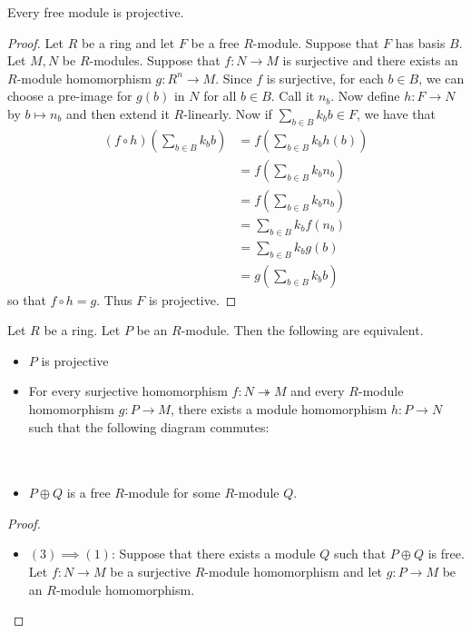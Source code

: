 \documentclass[a4paper]{article}
\begin{document}
\begin{lmm}{}{} Every free module is projective. 
\begin{proof}
Let $R$ be a ring and let $F$ be a free $R$-module. Suppose that $F$ has basis $B$. Let $M,N$ be $R$-modules. Suppose that $f:N\to M$ is surjective and there exists an $R$-module homomorphism $g:R^n\to M$. Since $f$ is surjective, for each $b\in B$, we can choose a pre-image for $g(b)$ in $N$ for all $b\in B$. Call it $n_b$. Now define $h:F\to N$ by $b\mapsto n_b$ and then extend it $R$-linearly. Now if $\sum_{b\in B}k_bb\in F$, we have that 
\begin{align*}
(f\circ h)\left(\sum_{b\in B}k_bb\right)&=f\left(\sum_{b\in B}k_bh(b)\right)\\
&=f\left(\sum_{b\in B}k_bn_b\right)\\
&=f\left(\sum_{b\in B}k_bn_b\right)\\
&=\sum_{b\in B}k_bf(n_b)\\
&=\sum_{b\in B}k_bg(b)\\
&=g\left(\sum_{b\in B}k_bb\right)
\end{align*}
so that $f\circ h=g$. Thus $F$ is projective. 
\end{proof}
\end{lmm}

\begin{prp}{}{} Let $R$ be a ring. Let $P$ be an $R$-module. Then the following are equivalent. 
\begin{itemize}
\item $P$ is projective 
\item For every surjective homomorphism $f:N\twoheadrightarrow M$ and every $R$-module homomorphism $g:P\to M$, there exists a module homomorphism $h:P\to N$ such that the following diagram commutes: \\~\\
 \\
\item $P\oplus Q$ is a free $R$-module for some $R$-module $Q$. 
\end{itemize} 
\begin{proof}~\\
\begin{itemize}
\item $(3)\implies(1)$: Suppose that there exists a module $Q$ such that $P\oplus Q$ is free. Let $f:N\to M$ be a surjective $R$-module homomorphism and let $g:P\to M$ be an $R$-module homomorphism. 
\end{itemize}
\end{proof}
\end{prp}
\end{document}
